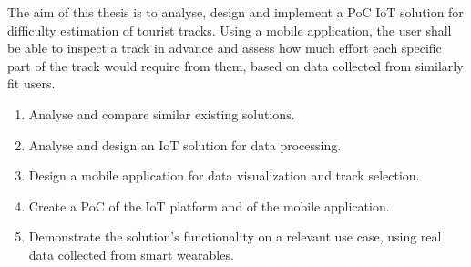 \linebreak
The aim of this thesis is to analyse, design and implement a PoC IoT solution for difficulty estimation of tourist tracks.
Using a mobile application, the user shall be able to inspect a track in advance and assess how much effort each specific part of the track would require from them, based on data collected from similarly fit users.
\begin{enumerate}
    \item Analyse and compare similar existing solutions.
    \item Analyse and design an IoT solution for data processing.
    \item Design a mobile application for data visualization and track selection.
    \item Create a PoC of the IoT platform and of the mobile application.
    \item Demonstrate the solution's functionality on a relevant use case, using real data collected from smart wearables.
\end{enumerate}
